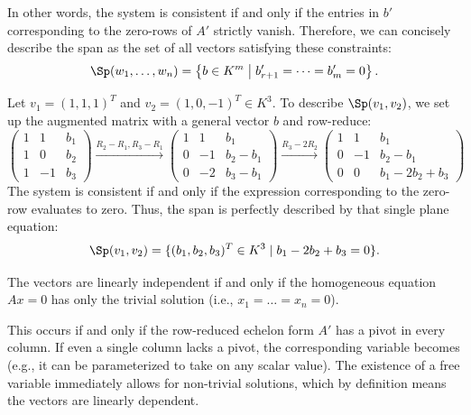 \begin{answer}
In other words, the system is consistent if and only if the entries in $b'$ corresponding to the zero-rows of $A'$ strictly vanish. Therefore, we can concisely describe the span as the set of all vectors satisfying these constraints:
\[
\Sp(w_{1}, \dots, w_{n}) = \left\{ b \in K^{m} \;\middle|\; b'_{r+1} = \dots = b'_{m} = 0 \right\}.
\]
\end{answer}

\begin{example}
\label{ex:span_calc}
Let $v_{1} = (1, 1, 1)^{T}$ and $v_{2} = (1, 0, -1)^{T} \in K^{3}$. To describe $\Sp(v_{1}, v_{2})$, we set up the augmented matrix with a general vector $b$ and row-reduce:
\[
\left( \begin{array}{cc|c} 1 & 1 & b_{1} \\ 1 & 0 & b_{2} \\ 1 & -1 & b_{3} \end{array} \right) \xrightarrow{R_{2}-R_{1}, R_{3}-R_{1}} \left( \begin{array}{cc|c} 1 & 1 & b_{1} \\ 0 & -1 & b_{2}-b_{1} \\ 0 & -2 & b_{3}-b_{1} \end{array} \right) \xrightarrow{R_{3}-2R_{2}} \left( \begin{array}{cc|c} 1 & 1 & b_{1} \\ 0 & -1 & b_{2}-b_{1} \\ \hline 0 & 0 & b_{1}-2b_{2}+b_{3} \end{array} \right)
\]
The system is consistent if and only if the expression corresponding to the zero-row evaluates to zero. Thus, the span is perfectly described by that single plane equation:
\[
\Sp(v_{1}, v_{2}) = \{ (b_{1}, b_{2}, b_{3})^{T} \in K^{3} \mid b_{1} - 2b_{2} + b_{3} = 0 \}.
\]
\end{example}

\begin{answer}[To Question 3]
The vectors are linearly independent if and only if the homogeneous equation $Ax = 0$ has only the trivial solution (i.e., $x_1 = \dots = x_n = 0$). 

This occurs if and only if the row-reduced echelon form $A'$ has a pivot in every column. If even a single column lacks a pivot, the corresponding variable becomes  (e.g., it can be parameterized to take on any scalar value). The existence of a free variable immediately allows for non-trivial solutions, which by definition means the vectors are linearly dependent.
\end{answer}


